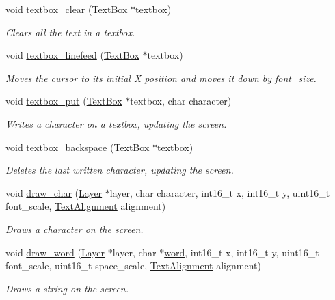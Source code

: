 \begin{DoxyCompactItemize}
void \mbox{\hyperlink{group__textbox_gad6a37472eecd02e21570d33447c740e8}{textbox\+\_\+clear}} (\mbox{\hyperlink{struct_text_box}{Text\+Box}} $\ast$textbox)
\begin{DoxyCompactList}\small\item\em Clears all the text in a textbox. \end{DoxyCompactList}\item 
void \mbox{\hyperlink{group__textbox_gae11fcc3afd300a03b3793eb4ec418207}{textbox\+\_\+linefeed}} (\mbox{\hyperlink{struct_text_box}{Text\+Box}} $\ast$textbox)
\begin{DoxyCompactList}\small\item\em Moves the cursor to its initial X position and moves it down by font\+\_\+size. \end{DoxyCompactList}\item 
void \mbox{\hyperlink{group__textbox_gab3ac8e604e6b7f8b6b4666d687a09716}{textbox\+\_\+put}} (\mbox{\hyperlink{struct_text_box}{Text\+Box}} $\ast$textbox, char character)
\begin{DoxyCompactList}\small\item\em Writes a character on a textbox, updating the screen. \end{DoxyCompactList}\item 
void \mbox{\hyperlink{group__textbox_gaa1d2e3ffe1e358b7d2956e2942859d4b}{textbox\+\_\+backspace}} (\mbox{\hyperlink{struct_text_box}{Text\+Box}} $\ast$textbox)
\begin{DoxyCompactList}\small\item\em Deletes the last written character, updating the screen. \end{DoxyCompactList}\item 
void \mbox{\hyperlink{group__textbox_ga74cef8828b7e729a30291cc8039728b0}{draw\+\_\+char}} (\mbox{\hyperlink{struct_layer}{Layer}} $\ast$layer, char character, int16\+\_\+t x, int16\+\_\+t y, uint16\+\_\+t font\+\_\+scale, \mbox{\hyperlink{group__textbox_gaa56f1a82069b5feeadbb4591cb3e474f}{Text\+Alignment}} alignment)
\begin{DoxyCompactList}\small\item\em Draws a character on the screen. \end{DoxyCompactList}\item 
void \mbox{\hyperlink{group__textbox_ga61553368dcaad7426ae892f8795c1128}{draw\+\_\+word}} (\mbox{\hyperlink{struct_layer}{Layer}} $\ast$layer, char $\ast$\mbox{\hyperlink{wordpicker_8c_ac00a4258bfdabd98aca279382135ec92}{word}}, int16\+\_\+t x, int16\+\_\+t y, uint16\+\_\+t font\+\_\+scale, uint16\+\_\+t space\+\_\+scale, \mbox{\hyperlink{group__textbox_gaa56f1a82069b5feeadbb4591cb3e474f}{Text\+Alignment}} alignment)
\begin{DoxyCompactList}\small\item\em Draws a string on the screen. \end{DoxyCompactList}\end{DoxyCompactItemize}
